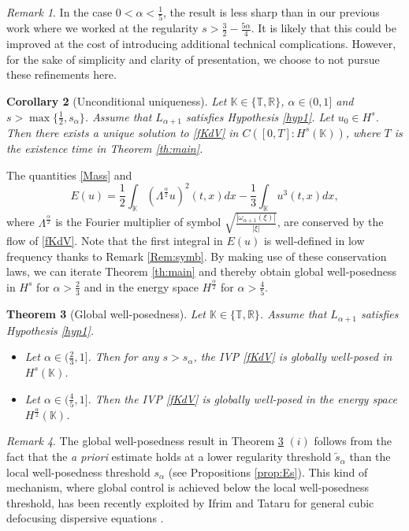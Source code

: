 \documentclass{amsart}
\newtheorem{theorem}{Theorem}[section]
\newtheorem{corollary}[theorem]{Corollary}
\theoremstyle{definition}
\theoremstyle{remark}
\newtheorem{remark}[theorem]{Remark}
\def\R{{\mathbb R}}
\def\K{{\mathbb K}}
\newcommand{\T}{\mathbb{T}}
\numberwithin{equation}{section}
\begin{document}
\begin{remark} In the case $0<\alpha<\frac15$, the result is less sharp than in our previous work \cite{MPV} where we worked at the regularity $s>\frac32-\frac{5\alpha}4$. It is likely that this could be improved at the cost of introducing additional technical complications. However, for the sake of simplicity and clarity of presentation, we choose to not pursue these refinements here.
\end{remark}

\begin{corollary}[Unconditional uniqueness] \label{coro:uu}
Let $\K\in\{\T, \R\}$, $\alpha\in (0,1]$ and $s>\max\{\frac12,s_\alpha\}$.  Assume that $L_{\alpha+1}$ satisfies Hypothesis \ref{hyp1}. Let $u_0 \in H^s$. Then there exists a unique solution to \eqref{fKdV} in $C([0,T] : H^s(\mathbb K))$, where $T$ is the existence time in Theorem \ref{th:main}.
\end{corollary}


The quantities \eqref{Mass} and
\begin{equation} \label{Energy-general}
E(u)=\frac12 \int_{\mathbb K} (\Lambda^{\frac{\alpha}2}u)^2(t,x)dx-\frac13 \int_{\mathbb K} u^3(t,x) dx ,
\end{equation}
where $\Lambda^{\frac{\alpha}2}$ is the Fourier multiplier of symbol $\sqrt{\frac{|\omega_{\alpha+1}(\xi)|}{|\xi|}}$, are conserved by the flow of \eqref{fKdV}. Note that the first integral in $E(u)$ is well-defined in low frequency thanks to Remark \ref{Rem:symb}.  By making use of these conservation laws, we can iterate Theorem \ref{th:main} and thereby obtain global well-posedness in $H^s$ for $\alpha>\frac23$ and in the energy space $H^{\frac{\alpha}2}$ for $\alpha > \frac{4}{5}$.

\begin{theorem}[Global well-posedness] \label{coro:gwp}
Let $\K\in\{\T, \R\}$. Assume that $L_{\alpha+1}$ satisfies Hypothesis \ref{hyp1}. 
\begin{itemize}
\item[(i)]  Let $\alpha \in (\frac23,1]$. Then for any $s>s_{\alpha}$, the IVP \eqref{fKdV} is globally well-posed in  $H^s(\mathbb K)$.
\item[(ii)] Let $\alpha\in (\frac45,1]$. Then the IVP \eqref{fKdV} is globally well-posed in the energy space $H^{\frac{\alpha}2}(\mathbb K)$.\end{itemize}
\end{theorem}

\begin{remark} 
The global well-posedness result in Theorem \ref{coro:gwp} $(i)$ follows from the fact that the \emph{a priori} estimate holds at a lower regularity threshold $\widetilde{s}_{\alpha}$ than the local well-posedness threshold $s_{\alpha}$  (see Propositions \ref{prop:Es}). This kind of mechanism, where global control is achieved below the local well-posedness threshold, has been recently exploited by Ifrim and Tataru for general cubic defocusing dispersive equations \cite{IfTa23,IfTa24}.\end{remark}
\end{document}

